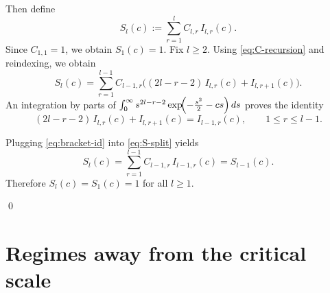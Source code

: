 \documentclass[11pt]{article}
\begin{document}
\noindent
Then define
\[
S_l(c):=\sum_{r=1}^l C_{l,r}\,I_{l,r}(c).
\]
\noindent
Since $C_{1,1}=1$, we obtain $S_1(c)=1$.
\smallskip
\noindent
Fix $l\ge 2$.
Using \eqref{eq:C-recursion} and reindexing, we obtain
\begin{equation}\label{eq:S-split}
S_l(c)
=
\sum_{r=1}^{l-1} C_{l-1,r}\Big((2l-r-2)\,I_{l,r}(c)+I_{l,r+1}(c)\Big).
\end{equation}
An integration by parts of $\int_0^\infty
s^{2l-r-2}\exp\!\Bigl(-\frac{s^2}{2}-cs\Bigr)\,ds$ proves the identity
\begin{equation}\label{eq:bracket-id}
(2l-r-2)\,I_{l,r}(c)+I_{l,r+1}(c)=I_{l-1,r}(c),
\qquad 1\le r\le l-1.
\end{equation}

\smallskip
\noindent
Plugging \eqref{eq:bracket-id} into \eqref{eq:S-split} yields
\[
S_l(c)=\sum_{r=1}^{l-1} C_{l-1,r}\,I_{l-1,r}(c)=S_{l-1}(c).
\]
Therefore $S_l(c)=S_1(c)=1$ for all $l\ge 1$.

\qed
\medskip
\color{black}




\section{Regimes away from the critical scale}
\label{sec:off-critical}
%
\end{document}
